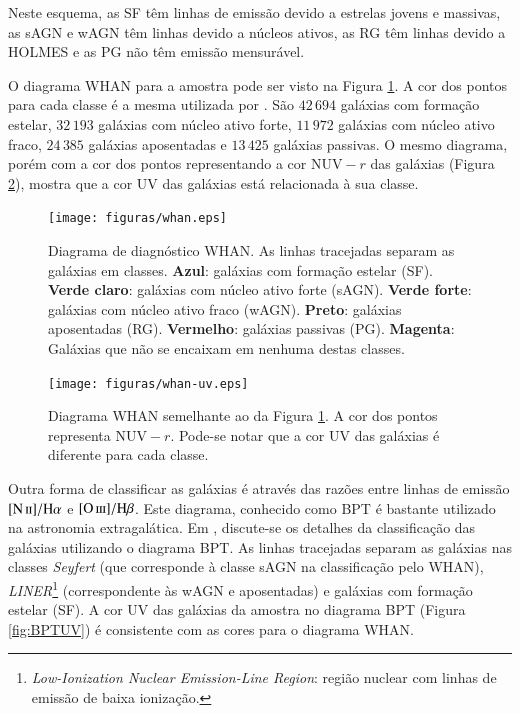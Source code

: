 Neste esquema, as SF têm linhas de emissão devido a estrelas jovens e massivas,
as sAGN e wAGN têm linhas devido a núcleos ativos, as RG têm linhas devido a
HOLMES e as PG não têm emissão mensurável.

O diagrama WHAN para a amostra \starlightUV pode ser visto na Figura
\ref{fig:Whan}. A cor dos pontos para cada classe é a mesma utilizada por
\citet{CidFernandes2011}. São $42\,694$ galáxias com formação estelar, $32\,193$
galáxias com núcleo ativo forte, $11\,972$ galáxias com núcleo ativo fraco,
$24\,385$ galáxias aposentadas e $13\,425$ galáxias passivas. O mesmo diagrama,
porém com a cor dos pontos representando a cor $\mathrm{NUV}-r$ das galáxias
(Figura \ref{fig:WhanUV}), mostra que a cor UV das galáxias está relacionada à
sua classe.

\begin{figure}
	\texttt{[image: figuras/whan.eps]}
	\caption[Diagrama de diagnóstico WHAN.]
	{Diagrama de diagnóstico WHAN. As linhas tracejadas separam as galáxias
	em classes. \textbf{Azul}: galáxias com formação estelar (SF). \textbf{Verde
	claro}: galáxias com núcleo ativo forte (sAGN). \textbf{Verde forte}:
	galáxias com núcleo ativo fraco (wAGN). \textbf{Preto}: galáxias aposentadas
	(RG). \textbf{Vermelho}: galáxias passivas (PG). \textbf{Magenta}: Galáxias
	que não se encaixam em nenhuma destas classes.}
	\label{fig:Whan}
\end{figure}

\begin{figure}
	\texttt{[image: figuras/whan-uv.eps]}
	\caption[Cores UV no diagrama WHAN.]
	{Diagrama WHAN semelhante ao da Figura \ref{fig:Whan}. A cor dos pontos
	representa $\mathrm{NUV}-r$. Pode-se notar que a cor UV das galáxias é
	diferente para cada classe.}
	\label{fig:WhanUV}
\end{figure}

Outra forma de classificar as galáxias é através das razões entre linhas de
emissão $\nII/\Halpha$ e $\oIII/\Hbeta$. Este diagrama, conhecido como BPT
\citep*{Baldwin1981} é bastante utilizado na astronomia extragalática. Em
\citet{CidFernandes2010}, discute-se os detalhes da classificação das galáxias
utilizando o diagrama BPT. As linhas tracejadas separam as galáxias nas classes
{\em Seyfert} (que corresponde à classe sAGN na classificação pelo WHAN), {\em
LINER}\footnote{{\em Low-Ionization Nuclear Emission-Line Region}: região
nuclear com linhas de emissão de baixa ionização.} (correspondente às wAGN e
aposentadas) e galáxias com formação estelar (SF). A cor UV das galáxias da
amostra no diagrama BPT (Figura \ref{fig:BPTUV}) é consistente com as cores para
o diagrama WHAN.

